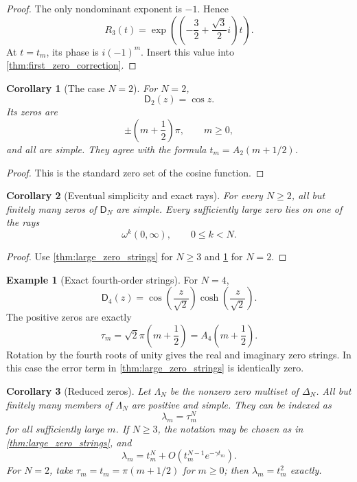 \documentclass[11pt,letterpaper]{article}
\newtheorem{corollary}[corollary]{Corollary}
\theoremstyle{definition}
\newtheorem{example}[example]{Example}
\theoremstyle{remark}
\newcommand{\Dfun}{\mathsf D}
\begin{document}
\begin{proof}
The only nondominant exponent is $-1$.  Hence
\[
R_3(t)
=
\exp\left(\left(-\frac32+\frac{\sqrt3}{2}i\right)t\right).
\]
At $t=t_m$, its phase is $i(-1)^m$.  Insert this value into \cref{thm:first_zero_correction}.
\end{proof}

\begin{corollary}[The case $N=2$]\label{cor:case_two_zeros}
For $N=2$,
\[
\Dfun_2(z)=\cos z.
\]
Its zeros are
\[
\pm\left(m+\frac12\right)\pi,
\qquad m\geq0,
\]
and all are simple.  They agree with the formula $t_m=A_2(m+1/2)$.
\end{corollary}

\begin{proof}
This is the standard zero set of the cosine function.
\end{proof}

\begin{corollary}[Eventual simplicity and exact rays]\label{cor:eventual_simplicity}
For every $N\geq2$, all but finitely many zeros of $\Dfun_N$ are simple.  Every sufficiently large zero lies on one of the rays
\[
\omega^k(0,\infty),
\qquad 0\leq k<N.
\]
\end{corollary}

\begin{proof}
Use \cref{thm:large_zero_strings} for $N\geq3$ and \cref{cor:case_two_zeros} for $N=2$.
\end{proof}


\begin{example}[Exact fourth-order strings]\label{ex:fourth_order_zeros}
For $N=4$,
\[
\Dfun_4(z)
=
\cos\left(\frac z{\sqrt2}\right)
\cosh\left(\frac z{\sqrt2}\right).
\]
The positive zeros are exactly
\[
\tau_m
=
\sqrt2\pi\left(m+\frac12\right)
=
A_4\left(m+\frac12\right).
\]
Rotation by the fourth roots of unity gives the real and imaginary zero strings.  In this case the error term in \cref{thm:large_zero_strings} is identically zero.
\end{example}

\begin{corollary}[Reduced zeros]\label{cor:reduced_zeros}
Let $\Lambda_N$ be the nonzero zero multiset of $\Delta_N$.  All but finitely many members of $\Lambda_N$ are positive and simple.  They can be indexed as
\[
\lambda_m=\tau_m^N
\]
for all sufficiently large $m$.  If $N\geq3$, the notation may be chosen
as in \cref{thm:large_zero_strings}, and
\[
\lambda_m
=
 t_m^N
+O\left(t_m^{N-1}e^{-\gamma t_m}\right).
\]
For $N=2$, take $\tau_m=t_m=\pi(m+1/2)$ for $m\geq0$; then
$\lambda_m=t_m^2$ exactly.
\end{corollary}
\end{document}
